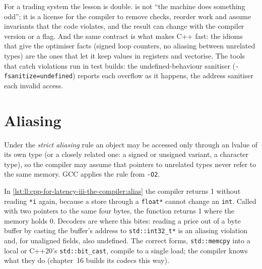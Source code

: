 \label{lst:ll:cpp-for-latency-iii-the-compiler:plus}
\label{lst:ll:cpp-for-latency-iii-the-compiler:null}

For a trading system the lesson is double.  is not ``the machine does something odd''; it is a license
for the compiler to remove checks, reorder work and assume invariants that the code violates, and the result can change
with the compiler version or a flag. And the same contract is what makes C++ fast: the idioms that give the optimiser
facts (signed loop counters, no aliasing between unrelated types) are the ones that let it keep values in registers and
vectorise. The tools that catch violations run in test builds: the undefined-behaviour sanitiser
(\texttt{-fsanitize=undefined}) reports each overflow as it happens, the address sanitiser each invalid access.

\section{Aliasing}

\begin{definition}\label{def:ll:cpp-for-latency-iii-the-compiler:alias}
Under the \emph{strict aliasing} rule an object may be accessed only through an lvalue of its own
type (or a closely related one: a signed or unsigned variant, a character type), so the compiler may assume that pointers
to unrelated types never refer to the same memory. GCC applies the rule from \texttt{-O2}.
\end{definition}

\label{lst:ll:cpp-for-latency-iii-the-compiler:alias}

In \cref{lst:ll:cpp-for-latency-iii-the-compiler:alias} the compiler returns 1 without reading \texttt{*i} again, because a
store through a \texttt{float*} cannot change an \texttt{int}. Called with two pointers to the same four bytes, the function
returns 1 where the memory holds 0. Decoders are where this bites: reading a price out of a byte buffer by casting the
buffer's address to \texttt{std::int32\_t*} is an aliasing violation and, for unaligned fields, also undefined. The correct
forms, \texttt{std::memcpy} into a local or C++20's \texttt{std::bit\_cast}, compile to a single load; the compiler knows
what they do (chapter~16 builds its codecs this way).

